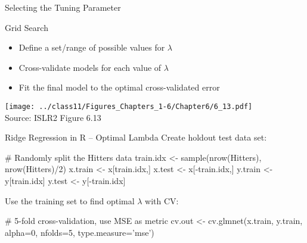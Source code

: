 \documentclass[ignorenonframetext,xcolor=x11names]{beamer}
\begin{document}


\begin{frame}{Selecting the Tuning Parameter}
\begin{block}{Grid Search}
\begin{itemize} 
   \item Define a set/range of possible values for $\lambda$
   \item Cross-validate models for each value of $\lambda$
   \item Fit the final model to the optimal cross-validated error
\end{itemize}
\end{block}

\vspace{\baselineskip}
\centering
\texttt{[image: ../class11/Figures\_Chapters\_1-6/Chapter6/6\_13.pdf]} \\

\scriptsize Source: ISLR2 Figure 6.13
\end{frame}

\begin{frame}[fragile]{Ridge Regression in R -- Optimal Lambda}
\small
Create holdout test data set:
\begin{Rcode}
# Randomly split the Hitters data
train.idx <- sample(nrow(Hitters), nrow(Hitters)/2)
x.train <- x[train.idx,]
x.test <- x[-train.idx,]
y.train <- y[train.idx]
y.test <- y[-train.idx]
\end{Rcode}
Use the training set to find optimal $\lambda$ with CV:
\begin{Rcode}
# 5-fold cross-validation, use MSE as metric
cv.out <- cv.glmnet(x.train, y.train, alpha=0, 
                    nfolds=5, type.measure='mse')
\end{Rcode}
\end{frame}
\end{document}
